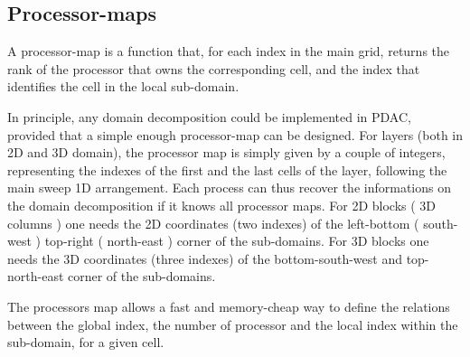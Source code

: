 \subsection{Processor-maps}
A processor-map is a function that, for each index in the main grid, returns the rank
of the processor that owns the corresponding cell, and the index that identifies the
cell in the local sub-domain.

In principle,
any domain decomposition could be implemented in PDAC, provided that a 
simple enough processor-map can be designed.
For layers (both in 2D and 3D domain), the processor map is simply given by a couple of integers,
representing the indexes of the first and the last cells of the layer, following
the main sweep 1D arrangement.  Each process can thus recover
the informations on the domain decomposition if it knows all processor maps.
For 2D blocks ( 3D columns ) one needs the 2D coordinates (two indexes) of the left-bottom ( south-west )
top-right ( north-east ) corner of the sub-domains.
For 3D blocks one needs the 3D coordinates (three indexes) of the bottom-south-west and
top-north-east corner of the sub-domains.

The processors map allows a fast and memory-cheap way to define the relations
between the global index, the number of processor and the local index 
within the sub-domain, for a given cell.\\
%
